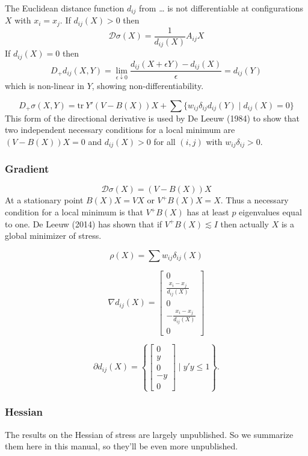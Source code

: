 \documentclass[
  12pt,
]{article}
\begin{document}
The Euclidean distance function \(d_{ij}\) from \ldots{} is not differentiable
at configurations \(X\) with \(x_i=x_j\). If \(d_{ij}(X)>0\) then
\[
\mathcal{D}\sigma(X)=\frac{1}{d_{ij}(X)}A_{ij}X
\]
If \(d_{ij}(X)=0\) then \[
D_+d_{ij}(X,Y)=\lim_{\epsilon\downarrow 0}\frac{d_{ij}(X+\epsilon Y)-d_{ij}(X)}{\epsilon}=d_{ij}(Y)
\] which is non-linear in \(Y\), showing non-differentiability.

\[
D_+\sigma(X,Y)=\text{tr}\ Y'(V-B(X))X+\sum\{w_{ij}\delta_{ij}d_{ij}(Y)\mid d_{ij}(X)=0\}
\] This form of the directional derivative is used by De Leeuw (1984) to
show that two independent necessary conditions for a local minimum are
\((V-B(X))X=0\) and \(d_{ij}(X)>0\) for all \((i,j)\) with
\(w_{ij}\delta_{ij}>0\).

\subsubsection{Gradient}\label{gradient}

\[
\mathcal{D}\sigma(X)=(V-B(X))X
\]
At a stationary point \(B(X)X=VX\) or \(V^+B(X)X=X\). Thus a necessary
condition for a local minimum is that \(V^+B(X)\) has at least \(p\)
eigenvalues equal to one. De Leeuw (2014) has shown that if
\(V^+B(X)\lesssim I\) then actually \(X\) is a global minimizer of stress.

\[
\rho(X)=\sum w_{ij}\delta_{ij}(X)
\]

\[
\nabla d_{ij}(X)=\begin{bmatrix}0\\
\frac{x_i-x_j}{d_{ij}(X)}\\0\\-\frac{x_i-x_j}{d_{ij}(X)}\\0\end{bmatrix}
\]

\[
\partial d_{ij}(X)=\left\{\begin{bmatrix}0\\
y\\0\\-y\\0\end{bmatrix}\mid y'y\leq 1\right\}.
\]

\subsubsection{Hessian}\label{hessian}

The results on the Hessian of stress are largely unpublished. So we
summarize them here in this manual, so they'll be even more unpublished.
\end{document}

